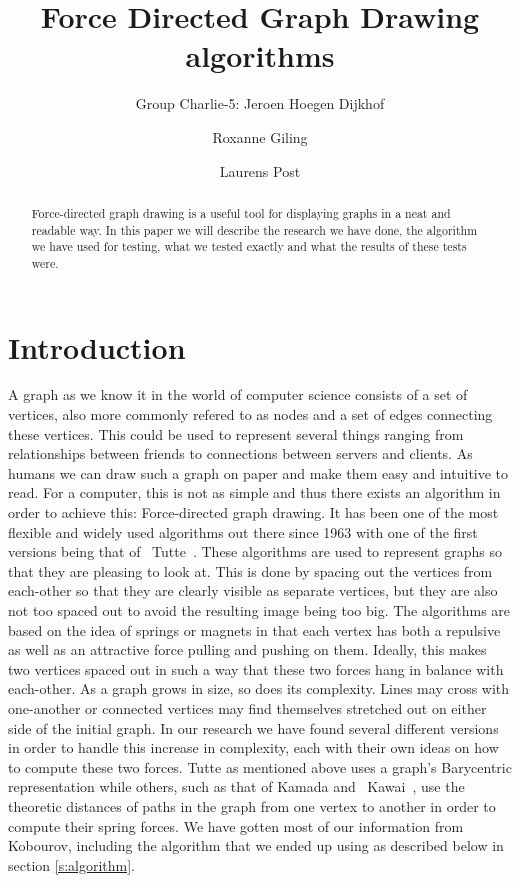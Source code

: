 \documentclass[a4paper,12pt,twoside]{article}
\begin{document}
\title{Force Directed Graph Drawing algorithms}
\author{Group Charlie-5: Jeroen Hoegen Dijkhof \and Roxanne Giling \and Laurens Post}
\maketitle
\begin{abstract}
Force-directed graph drawing is a useful tool for displaying graphs in a neat and readable way. In this paper we will describe the research we have done, the algorithm we have used for testing, what we tested exactly and what the results of these tests were.
\end{abstract}
\newpage

\section{Introduction}\label{s:Introduction}
A graph as we know it in the world of computer science consists of a set of vertices, also more commonly refered to as nodes and a set of edges connecting these vertices\cite{Graph}. This could be used to represent several things ranging from relationships between friends to connections between servers and clients. As humans we can draw such a graph on paper and make them easy and intuitive to read. For a computer, this is not as simple and thus there exists an algorithm in order to achieve this: Force-directed graph drawing. It has been one of the most flexible and widely used algorithms out there since 1963 with one of the first versions being that of ~Tutte~\cite{Tutte}. These algorithms are used to represent graphs so that they are pleasing to look at. This is done by spacing out the vertices from each-other so that they are clearly visible as separate vertices, but they are also not too spaced out to avoid the resulting image being too big. The algorithms are based on the idea of springs or magnets in that each vertex has both a repulsive as well as an attractive force pulling and pushing on them. Ideally, this makes two vertices spaced out in such a way that these two forces hang in balance with each-other. As a graph grows in size, so does its complexity. Lines may cross with one-another or connected vertices may find themselves stretched out on either side of the initial graph. In our research we have found several different versions in order to handle this increase in complexity, each with their own ideas on how to compute these two forces. Tutte as mentioned above uses a graph's Barycentric representation while others, such as that of Kamada and ~Kawai~\cite{Kawai}, use the theoretic distances of paths in the graph from one vertex to another in order to compute their spring forces. We have gotten most of our information from Kobourov\cite{Kobourov}, including the algorithm that we ended up using as described below in section \ref{s:algorithm}.
\end{document}
